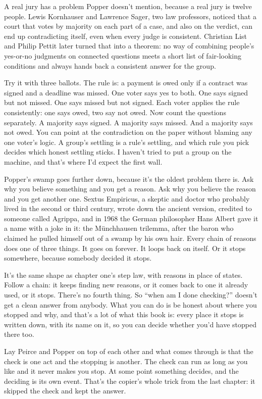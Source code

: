 \documentclass[11pt,twoside]{article}
\theoremstyle{thielethm}
\theoremstyle{thieledef}
\theoremstyle{thieledef}
\theoremstyle{thieledef}
\theoremstyle{thielethm}
\theoremstyle{thieleobs}
\theoremstyle{thielethm}
\begin{document}
A real jury has a problem Popper doesn't mention, because a real jury is twelve people. Lewis Kornhauser and Lawrence Sager, two law professors, noticed that a court that votes by majority on each part of a case, and also on the verdict, can end up contradicting itself, even when every judge is consistent. Christian List and Philip Pettit later turned that into a theorem: no way of combining people's yes-or-no judgments on connected questions meets a short list of fair-looking conditions and always hands back a consistent answer for the group.

Try it with three ballots. The rule is: a payment is owed only if a contract was signed and a deadline was missed. One voter says yes to both. One says signed but not missed. One says missed but not signed. Each voter applies the rule consistently: one says owed, two say not owed. Now count the questions separately. A majority says signed. A majority says missed. And a majority says not owed. You can point at the contradiction on the paper without blaming any one voter's logic. A group's settling is a rule's settling, and which rule you pick decides which honest settling sticks. I haven't tried to put a group on the machine, and that's where I'd expect the first wall.

Popper's swamp goes further down, because it's the oldest problem there is. Ask why you believe something and you get a reason. Ask why you believe the reason and you get another one. Sextus Empiricus, a skeptic and doctor who probably lived in the second or third century, wrote down the ancient version, credited to someone called Agrippa, and in 1968 the German philosopher Hans Albert gave it a name with a joke in it: the Münchhausen trilemma, after the baron who claimed he pulled himself out of a swamp by his own hair. Every chain of reasons does one of three things. It goes on forever. It loops back on itself. Or it stops somewhere, because somebody decided it stops.

It's the same shape as chapter one's step law, with reasons in place of states. Follow a chain: it keeps finding new reasons, or it comes back to one it already used, or it stops. There's no fourth thing. So ``when am I done checking?'' doesn't get a clean answer from anybody. What you can do is be honest about where you stopped and why, and that's a lot of what this book is: every place it stops is written down, with its name on it, so you can decide whether you'd have stopped there too.

Lay Peirce and Popper on top of each other and what comes through is that the check is one act and the stopping is another. The check can run as long as you like and it never makes you stop. At some point something decides, and the deciding is its own event. That's the copier's whole trick from the last chapter: it skipped the check and kept the answer.
\end{document}
